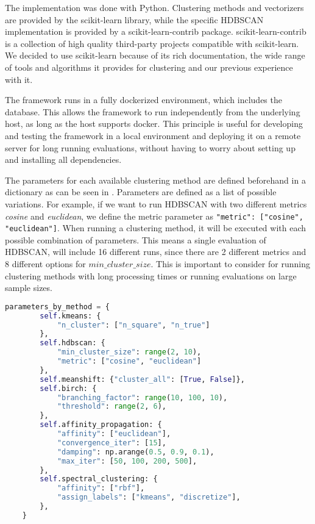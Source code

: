 The implementation was done with Python.
Clustering methods and vectorizers are provided by the scikit-learn library\cite{scikit-learn},
while the specific HDBSCAN implementation is provided by a scikit-learn-contrib package\cite{McInnes2017}.
scikit-learn-contrib is a collection of high quality third-party projects compatible with scikit-learn.
We decided to use scikit-learn because of its rich documentation,
the wide range of tools and algorithms it provides for clustering and our previous experience with it.

The framework runs in a fully \gls{dockerized} environment, which includes the database.
This allows the framework to run independently from the underlying host, as long as the host supports \Gls{docker}.
This principle is useful for developing and testing the framework in a local environment
and deploying it on a remote server for long running evaluations,
without having to worry about setting up and installing all dependencies.

The parameters for each available clustering method are defined beforehand in a dictionary
as can be seen in .
Parameters are defined as a list of possible variations.
For example, if we want to run HDBSCAN with two different metrics \textit{cosine} and \textit{euclidean},
we define the metric parameter as \lstinline{"metric": ["cosine", "euclidean"]}.
When running a clustering method, it will be executed with each possible combination of parameters.
This means a single evaluation of HDBSCAN, will include 16 different runs,
since there are 2 different metrics and 8 different options for $min\_cluster\_size$.
This is important to consider for running clustering methods with long processing times
or running evaluations on large sample sizes.

\begin{lstlisting}[language=Python, caption=Predefined parameters for different clustering methods.,label={lst:cluster_method_parameters}]
    parameters_by_method = {
        self.kmeans: {
            "n_cluster": ["n_square", "n_true"]
        },
        self.hdbscan: {
            "min_cluster_size": range(2, 10),
            "metric": ["cosine", "euclidean"]
        },
        self.meanshift: {"cluster_all": [True, False]},
        self.birch: {
            "branching_factor": range(10, 100, 10),
            "threshold": range(2, 6),
        },
        self.affinity_propagation: {
            "affinity": ["euclidean"],
            "convergence_iter": [15],
            "damping": np.arange(0.5, 0.9, 0.1),
            "max_iter": [50, 100, 200, 500],
        },
        self.spectral_clustering: {
            "affinity": ["rbf"],
            "assign_labels": ["kmeans", "discretize"],
        },
    }
\end{lstlisting}


